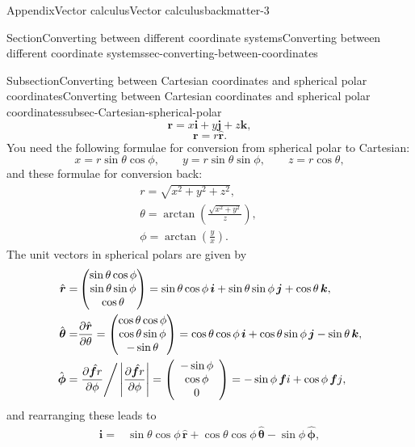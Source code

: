 \documentclass[oneside,10pt,]{book}
\numberwithin{equation}{section}
\newcommand{\pd}[2]{\frac{\partial#1}{\partial#2}}
\renewcommand{\bf}{\boldsymbol{f}}
\begin{document}
\begin{appendixptx}{Appendix}{Vector calculus}{}{Vector calculus}{}{}{backmatter-3}
\begin{sectionptx}{Section}{Converting between different coordinate systems}{}{Converting between different coordinate systems}{}{}{sec-converting-between-coordinates}
\begin{subsectionptx}{Subsection}{Converting between Cartesian coordinates and spherical polar coordinates}{}{Converting between Cartesian coordinates and spherical polar coordinates}{}{}{subsec-Cartesian-spherical-polar}
\begin{equation*}
\boldsymbol{r}=x\boldsymbol{i}+y\boldsymbol{j}+z\boldsymbol{k},
\end{equation*}
%
\begin{equation}
\boldsymbol{r}=r\hat{\boldsymbol{r}}.\label{eq-rsph}
\end{equation}
You need the following formulae for conversion from spherical polar to Cartesian:%
\begin{equation}
x=r\sin\theta\cos\phi,\qquad y=r\sin\theta\sin\phi,\qquad z=r\cos\theta,\label{eq-sphcart}
\end{equation}
and these formulae for conversion back:%
\begin{gather}
r=\sqrt{x^2+y^2+z^2},\label{eq-cartsph-r}\\
\theta=\arctan\left(\frac{\sqrt{x^2+y^2}}{z}\right),\qquad\label{eq-cartsph-theta}\\
\phi=\arctan\left(\frac{y}{x}\right).\label{eq-cartsph-z}
\end{gather}
The unit vectors in spherical polars are given by%
\begin{align}
\hat{\boldsymbol{r}}=&\left(\begin{matrix}\sin\theta\cos\phi\\\sin\theta\sin\phi\\\cos\theta\end{matrix}\right)
=\sin\theta\cos\phi\,\boldsymbol{i}+\sin\theta\sin\phi\,\boldsymbol{j}+\cos\theta\,\boldsymbol{k},\label{eq-sphpolarcartunitvectors-r}\\
\hat{\boldsymbol{\theta}}=&\pd{\hat{\boldsymbol{r}}}{\theta}
=\left(\begin{matrix}\cos\theta\cos\phi\\\cos\theta\sin\phi\\-\sin\theta\end{matrix}\right)
=\cos\theta\cos\phi\,\boldsymbol{i}+\cos\theta\sin\phi\,\boldsymbol{j}-\sin\theta\,\boldsymbol{k},\label{eq-sphpolarcartunitvectors-theta}\\
\hat{\boldsymbol{\phi}}=&\left.\pd{\hat{\bf r}}{\phi}\right/\left|\pd{\hat{\bf r}}{\phi}\right|=\left(\begin{array}{c}-\sin\phi\\\cos\phi\\0\end{array}\right)=-\sin\phi\,{\bf i}+\cos\phi\,{\bf j},\label{eq-sphpolarcartunitvectors-z}
\end{align}
and rearranging these leads to%
\begin{align}
\boldsymbol{i}=&\sin\theta\cos\phi\,\hat{\boldsymbol{r}}+\cos\theta\cos\phi\,\hat{\boldsymbol{\theta}}-\sin\phi\,\hat{\boldsymbol{\phi}},\label{eq-cartsphpolarunitvectors-i}\\

\end{align}
\end{subsectionptx}
\end{sectionptx}
\end{appendixptx}
\end{document}
